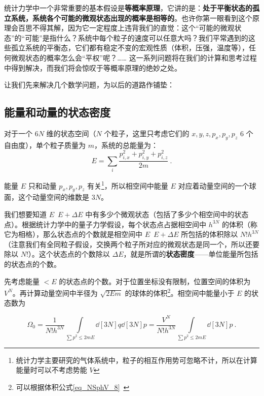 

统计力学中一个非常重要的基本假设是\textbf{等概率原理}，它讲的是：\textbf{处于平衡状态的孤立系统，系统各个可能的微观状态出现的概率是相等的}。也许你第一眼看到这个原理会百思不得其解，因为它一定程度上违背我们的直觉：这个“可能的微观状态”的“可能”是指什么？系统中每个粒子的速度可以任意大吗？我们平常遇到的这些孤立系统的平衡态，它们都有稳定不变的宏观性质（体积，压强，温度等），任何微观状态的概率怎么会“平权”呢？…… 这一系列问题将在我们的计算和思考过程中得到解决，而我们将会惊叹于等概率原理的绝妙之处。

让我们先来解决几个数学问题，为以后的道路作铺垫：
\subsection{能量和动量的状态密度}
对于一个 $6N$ 维的状态空间（$N$ 个粒子，这里只考虑它们的 $x,y,z,p_x,p_y,p_z$ $6$ 个自由度），单个粒子质量为 $m$，系统的总能量为：
\begin{equation}
E=\sum_{i} \frac{p_{i,x}^2+p_{i,y}^2+p_{i,z}^2}{2m}~.
\end{equation}


能量 $E$ 只和动量 $p_x,p_y,p_z$ 有关\footnote{统计力学主要研究的气体系统中，粒子的相互作用势可忽略不计，所以在计算能量时可以不考虑势能 $V$}，所以相空间中能量 $E$ 对应着动量空间的一个球面，这个动量空间的维数是 $3N$。

我们想要知道 $E$~$E+\Delta E$ 中有多少个微观状态（包括了多少个相空间中的状态点）。根据统计力学中的量子力学假设，每个状态点占据相空间中 $h^{3N}$ 的体积（称它为相格），那么状态点的个数就是相空间中 $E$~$E+\Delta E$ 所包括的体积除以 $N!h^{3N}$（注意我们有全同粒子假设，交换两个粒子所对应的微观状态是同一个，所以还要除以 $N!$）。这个状态点的个数除以 $\Delta E$，就是所谓的\textbf{状态密度}——单位能量所包括的状态点的个数。

先考虑能量 $<E$ 的状态点的个数。对于位置坐标没有限制，位置空间的体积为 $V^N$。再计算动量空间中半径为 $\sqrt{2Em}$ 的球体的体积\footnote{可以根据体积公式\autoref{eq_NSphV_8}~}。相空间中能量小于 $E$ 的状态数为

\begin{equation}\label{eq_IdSDp_1}
\Omega_0 = \frac{1}{N! h^{3N}} \int\limits_{\sum p^2 \leqslant 2mE} \dd[3N]{q} \dd[3N]{p} = \frac{V^N}{N! h^{3N}} \int\limits_{\sum p^2 \leqslant 2mE} \dd[3N]{p}~.
\end{equation}


